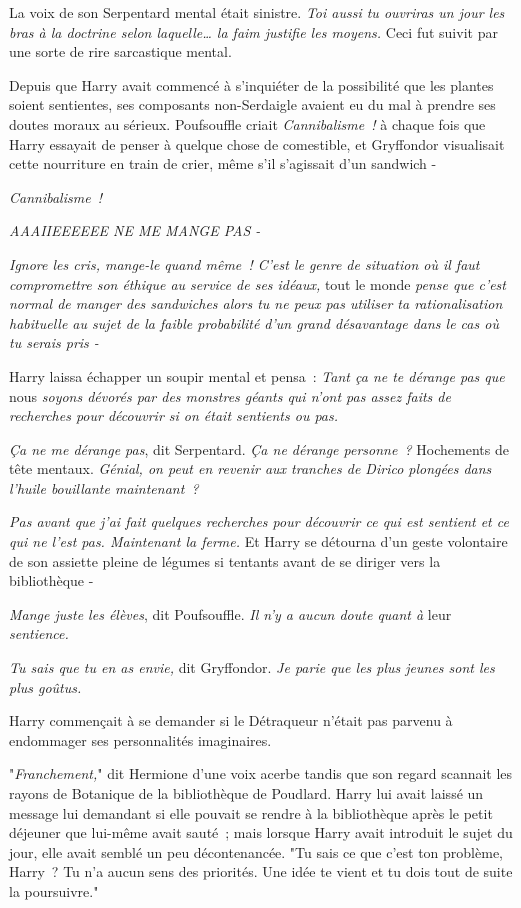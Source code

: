 La voix de son Serpentard mental était sinistre. \emph{Toi aussi tu ouvriras un jour les bras à la doctrine selon laquelle… la faim justifie les moyens.} Ceci fut suivit par une sorte de rire sarcastique mental.

Depuis que Harry avait commencé à s'inquiéter de la possibilité que les plantes soient sentientes, ses composants non-Serdaigle avaient eu du mal à prendre ses doutes moraux au sérieux. Poufsouffle criait \emph{Cannibalisme~!} à chaque fois que Harry essayait de penser à quelque chose de comestible, et Gryffondor visualisait cette nourriture en train de crier, même s'il s'agissait d'un sandwich -

\emph{Cannibalisme~!}

\emph{AAAIIEEEEEE NE ME MANGE PAS -}

\emph{Ignore les cris, mange-le quand même~! C'est le genre de situation où il faut compromettre son éthique au service de ses idéaux,} tout le monde \emph{pense que c'est normal de manger des sandwiches alors tu ne peux pas utiliser ta rationalisation habituelle au sujet de la faible probabilité d'un grand désavantage dans le cas où tu serais pris -}

Harry laissa échapper un soupir mental et pensa~: \emph{Tant ça ne te dérange pas que} nous \emph{soyons dévorés par des monstres géants qui n'ont pas assez faits de recherches pour découvrir si on était sentients ou pas.}

\emph{Ça ne me dérange pas}, dit Serpentard. \emph{Ça ne dérange personne~?} Hochements de tête mentaux. \emph{Génial, on peut en revenir aux tranches de Dirico plongées dans l'huile bouillante maintenant~?}

\emph{Pas avant que j'ai fait quelques recherches pour découvrir ce qui est sentient et ce qui ne l'est pas. Maintenant la ferme.} Et Harry se détourna d'un geste volontaire de son assiette pleine de légumes si tentants avant de se diriger vers la bibliothèque -

\emph{Mange juste les élèves}, dit Poufsouffle. \emph{Il n'y a aucun doute quant à} leur \emph{sentience.}

\emph{Tu sais que tu en as envie,} dit Gryffondor. \emph{Je parie que les plus jeunes sont les plus goûtus.}

Harry commençait à se demander si le Détraqueur n'était pas parvenu à endommager ses personnalités imaginaires.

\later

"\emph{Franchement,}" dit Hermione d'une voix acerbe tandis que son regard scannait les rayons de Botanique de la bibliothèque de Poudlard. Harry lui avait laissé un message lui demandant si elle pouvait se rendre à la bibliothèque après le petit déjeuner que lui-même avait sauté~; mais lorsque Harry avait introduit le sujet du jour, elle avait semblé un peu décontenancée. "Tu sais ce que c'est ton problème, Harry~? Tu n'a aucun sens des priorités. Une idée te vient et tu dois tout de suite la poursuivre."

